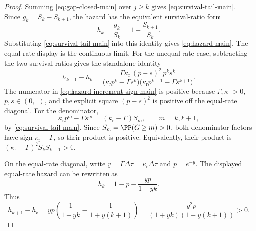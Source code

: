 \begin{proof}
Summing \eqref{eq:gap-closed-main} over \(j\ge k\) gives
\eqref{eq:survival-tail-main}.  Since \(g_k=S_k-S_{k+1}\), the hazard has the
equivalent survival-ratio form
\[
h_k=\frac{g_k}{S_k}=1-\frac{S_{k+1}}{S_k}.
\]
Substituting \eqref{eq:survival-tail-main} into this identity gives
\eqref{eq:hazard-main}.  The equal-rate display is the continuous limit.
For the unequal-rate case, subtracting the two survival ratios gives the
standalone identity
\begin{equation}\label{eq:hazard-increment-sign-main}
h_{k+1}-h_k
=
\frac{
  \Gamma\kappa_{\mathrm r}\,
  (p-s)^2\,p^k s^k
}{
  \bigl(\kappa_{\mathrm r}p^k-\Gamma s^k\bigr)
  \bigl(\kappa_{\mathrm r}p^{k+1}-\Gamma s^{k+1}\bigr)
}.
\end{equation}
The numerator in \eqref{eq:hazard-increment-sign-main} is positive because
\(\Gamma,\kappa_{\mathrm r}>0\), \(p,s\in(0,1)\), and the explicit square
\((p-s)^2\) is positive off the equal-rate diagonal.  For the denominator,
\[
\kappa_{\mathrm r}p^m-\Gamma s^m
=(\kappa_{\mathrm r}-\Gamma)S_m,\qquad m=k,k+1,
\]
by \eqref{eq:survival-tail-main}.  Since \(S_m=\PP(G\ge m)>0\), both
denominator factors have sign \(\kappa_{\mathrm r}-\Gamma\), so their product
is positive.  Equivalently, their product is
\((\kappa_{\mathrm r}-\Gamma)^2S_kS_{k+1}>0\).

On the equal-rate diagonal, write
\(y=\Gamma\Delta\tau=\kappa_{\mathrm r}\Delta\tau\) and
\(p=e^{-y}\).  The displayed equal-rate hazard can be rewritten as
\[
h_k
=1-p-\frac{y p}{1+y k}.
\]
Thus
\[
h_{k+1}-h_k
=yp\left(\frac1{1+yk}-\frac1{1+y(k+1)}\right)
=\frac{y^2p}{(1+yk)(1+y(k+1))}>0.
\]
\end{proof}


